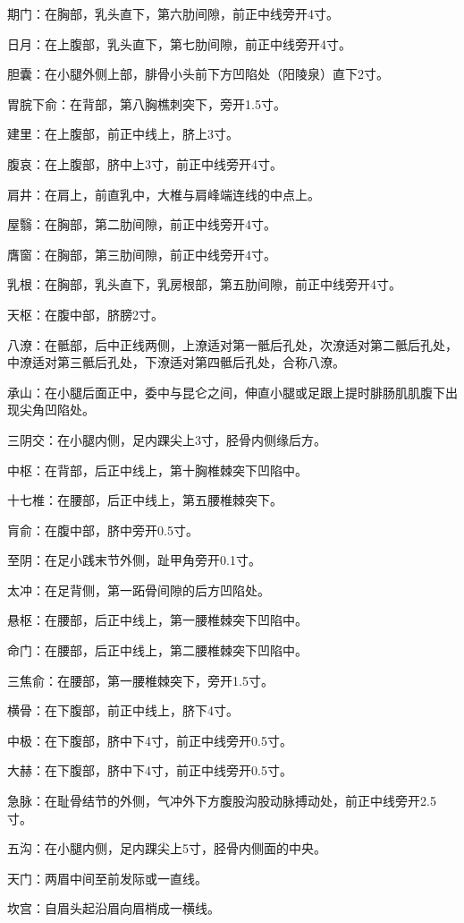 \documentclass[12pt,UTF8]{ctexbook}
\begin{document}
期门：在胸部，乳头直下，第六肋间隙，前正中线旁开4寸。

日月：在上腹部，乳头直下，第七肋间隙，前正中线旁开4寸。

胆囊：在小腿外侧上部，腓骨小头前下方凹陷处（阳陵泉）直下2寸。

胃脘下俞：在背部，第八胸樵刺突下，旁开1.5寸。

建里：在上腹部，前正中线上，脐上3寸。

腹哀：在上腹部，脐中上3寸，前正中线旁开4寸。

肩井：在肩上，前直乳中，大椎与肩峰端连线的中点上。

屋翳：在胸部，第二肋间隙，前正中线旁开4寸。

膺窗：在胸部，第三肋间隙，前正中线旁开4寸。

乳根：在胸部，乳头直下，乳房根部，第五肋间隙，前正中线旁开4寸。

天枢：在腹中部，脐膀2寸。

八潦：在骶部，后中正线两侧，上潦适对第一骶后孔处，次潦适对第二骶后孔处，中潦适对第三骶后孔处，下潦适对第四骶后孔处，合称八潦。

承山：在小腿后面正中，委中与昆仑之间，伸直小腿或足跟上提时腓肠肌肌腹下出现尖角凹陷处。

三阴交：在小腿内侧，足内踝尖上3寸，胫骨内侧缘后方。

中枢：在背部，后正中线上，第十胸椎棘突下凹陷中。

十七椎：在腰部，后正中线上，第五腰椎棘突下。

肓俞：在腹中部，脐中旁开0.5寸。

至阴：在足小践末节外侧，趾甲角旁开0.1寸。

太冲：在足背侧，第一跖骨间隙的后方凹陷处。

悬枢：在腰部，后正中线上，第一腰椎棘突下凹陷中。

命门：在腰部，后正中线上，第二腰椎棘突下凹陷中。

三焦俞：在腰部，第一腰椎棘突下，旁开1.5寸。

横骨：在下腹部，前正中线上，脐下4寸。

中极：在下腹部，脐中下4寸，前正中线旁开0.5寸。

大赫：在下腹部，脐中下4寸，前正中线旁开0.5寸。

急脉：在耻骨结节的外侧，气冲外下方腹股沟股动脉搏动处，前正中线旁开2.5寸。

五沟：在小腿内侧，足内踝尖上5寸，胫骨内侧面的中央。

天门：两眉中间至前发际或一直线。

坎宫：自眉头起沿眉向眉梢成一横线。
\end{document}
